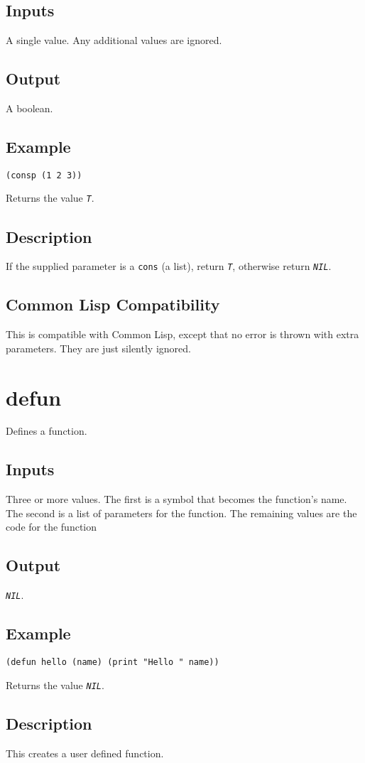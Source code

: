 \documentclass[10pt, openany]{book}
\newcommand{\constant}[1]{\emph{\texttt{#1}}}
\newcommand{\datatype}[1]{\texttt{#1}}
\newcommand{\cl}{Common Lisp}
\begin{document}
\subsection{Inputs}
A single value.  Any additional values are ignored.
\subsection{Output}
A boolean.
\subsection{Example}
\begin{lstlisting}
(consp (1 2 3))
\end{lstlisting}
Returns the value \constant{T}.
\subsection{Description}
If the supplied parameter is a \datatype{cons} (a list), return \constant{T}, otherwise return \constant{NIL}.
\subsection{Common Lisp Compatibility}
This is compatible with \cl, except that no error is thrown with extra parameters.  They are just silently ignored.

\section{defun}
Defines a function.
\subsection{Inputs}
Three or more values.  The first is a symbol that becomes the function's name.  The second is a list of parameters for the function.  The remaining values are the code for the function
\subsection{Output}
\constant{NIL}.
\subsection{Example}
\begin{lstlisting}
(defun hello (name) (print "Hello " name))
\end{lstlisting}
Returns the value \constant{NIL}.
\subsection{Description}
This creates a user defined function.
\end{document}
